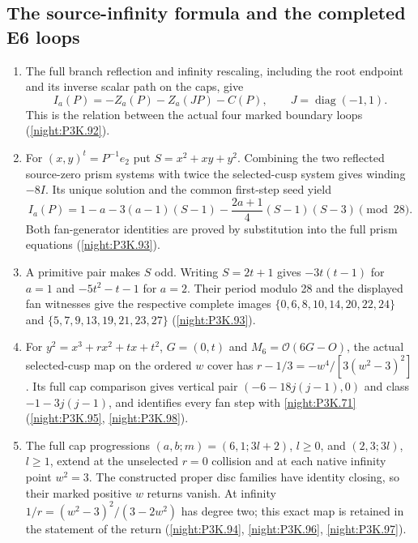 \subsection{The source-infinity formula and the completed E6 loops}
\RungOne
\begin{enumerate}[label=\arabic*.]
\item The full branch reflection and infinity rescaling, including
  the root endpoint and its inverse scalar path on the caps, give
  \[
  I_a(P)=-Z_a(P)-Z_a(JP)-C(P),\qquad
  J=\operatorname{diag}(-1,1).
  \]
  This is the relation between the actual four marked boundary
  loops (\cref{night:P3K.92}).
\item For $(x,y)^t=P^{-1}e_2$ put $S=x^2+xy+y^2$.
  Combining the two reflected source-zero prism systems with
  twice the selected-cusp system gives winding $-8I$.
  Its unique solution and the common first-step seed yield
  \[
  I_a(P)=1-a-3(a-1)(S-1)
       -\frac{2a+1}{4}(S-1)(S-3)\pmod {28}.
  \]
  Both fan-generator identities are proved by substitution into
  the full prism equations (\cref{night:P3K.93}).
\item A primitive pair makes $S$ odd.  Writing $S=2t+1$ gives
  $-3t(t-1)$ for $a=1$ and $-5t^2-t-1$ for $a=2$.
  Their period modulo 28 and the displayed fan witnesses give
  the respective complete images
  $\{0,6,8,10,14,20,22,24\}$ and
  $\{5,7,9,13,19,21,23,27\}$
  (\cref{night:P3K.93}).
\item For $y^2=x^3+rx^2+tx+t^2$, $G=(0,t)$ and
  $M_6=\mathcal O(6G-O)$, the actual selected-cusp map on the
  ordered $w$ cover has
  $r-1/3=-w^4/[3(w^2-3)^2]$.
  Its full cap comparison gives vertical pair
  $(-6-18j(j-1),0)$ and class $-1-3j(j-1)$, and identifies
  every fan step with \cref{night:P3K.71}
  (\cref{night:P3K.95}, \cref{night:P3K.98}).
\item The full cap progressions
  $(a,b;m)=(6,1;3l+2)$, $l\geq0$, and
  $(2,3;3l)$, $l\geq1$, extend at the unselected $r=0$
  collision and at each native infinity point $w^2=3$.
  The constructed proper disc families have identity closing,
  so their marked positive $w$ returns vanish.  At infinity
  $1/r=(w^2-3)^2/(3-2w^2)$ has degree two; this exact map is
  retained in the statement of the return
  (\cref{night:P3K.94}, \cref{night:P3K.96}, \cref{night:P3K.97}).
\end{enumerate}

\providecommand{\LL}{\mathcal L}
\providecommand{\cT}{\mathcal T}
\providecommand{\HP}{\mathbb H\mathbb P}
\providecommand{\tr}{\operatorname{tr}}
\providecommand{\sgn}{\operatorname{sgn}}
\providecommand{\vir}{\mathrm{vir}}

